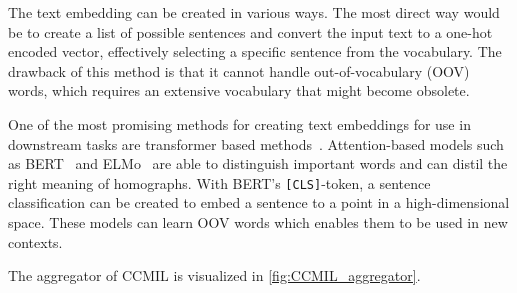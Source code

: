 The text embedding can be created in various ways.
The most direct way would be to create a list of possible sentences and convert the input text to a one-hot encoded vector, effectively selecting a specific sentence from the vocabulary.
The drawback of this method is that it cannot handle out-of-vocabulary (OOV) words, which requires an extensive vocabulary that might become obsolete.

One of the most promising methods for creating text embeddings for use in downstream tasks are transformer based methods~.
Attention-based models such as BERT~ and ELMo~ are able to distinguish important words and can distil the right meaning of homographs.
With BERT's \texttt{[CLS]}-token, a sentence classification can be created to embed a sentence to a point in a high-dimensional space.
These models can learn OOV words which enables them to be used in new contexts.

The aggregator of CCMIL is visualized in \cref{fig:CCMIL_aggregator}.

\begin{figure*}
    \centering
    
    \caption[Clinical Context Multi-Instance Learning aggregator.]{
            Clinical Context Multi-Instance Learning (CCMIL) aggregator.
            Just like in Variance MIL (VarMIL), tile features are presented to a multi-layer perceptron (MLP) to learn attention weights per tile.
            The attention weights are multiplied with their corresponding tile features to get attention-weighted tile features.
            From these, the mean $\mu$ and variance $\sigma^2$ are calculated and concatenated.
            Extending VarMIL, CCMIL further concatenates a text embedding that may contain clinical context of the input image.
            The aggregate is further processed in another MLP for classification.
        }
    \label{fig:CCMIL_aggregator}
\end{figure*}

